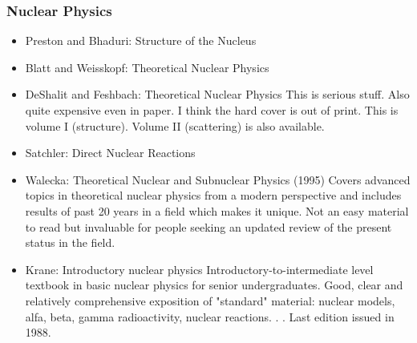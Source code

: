 \documentclass[10pt,a4paper]{book}
\theoremstyle{definition}
\begin{document}
\subsubsection{Nuclear Physics}
\begin{itemize}
\item Preston and Bhaduri: Structure of the Nucleus
\item Blatt and Weisskopf: Theoretical Nuclear Physics
\item DeShalit and Feshbach: Theoretical Nuclear Physics
This is serious stuff.  Also quite expensive even in paper.  I think the hard cover is out of print.  This is volume I (structure).  Volume II (scattering) is also available.
\item Satchler: Direct Nuclear Reactions
\item Walecka: Theoretical Nuclear and Subnuclear Physics (1995)
Covers advanced topics in theoretical nuclear physics from a modern perspective and includes results of past 20 years in a field which makes it unique.  Not an easy material to read but invaluable for people seeking an updated review of the present status in the field.
\item Krane: Introductory nuclear physics
Introductory-to-intermediate level textbook in basic nuclear physics for senior undergraduates.  Good, clear and relatively comprehensive exposition of "standard" material: nuclear models, alfa, beta, gamma radioactivity, nuclear reactions. . .  Last edition issued in 1988.
\end{itemize}
\end{document}
